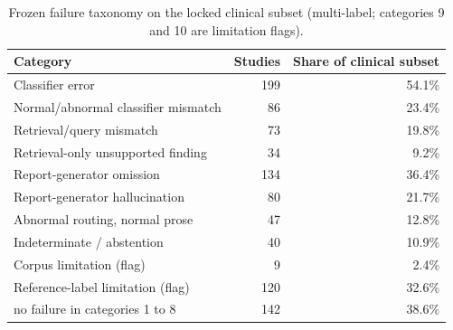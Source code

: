 \begin{table}[t]
\centering
\scriptsize
\begin{tabular}{lrr}
\hline
Category & Studies & Share of clinical subset \\
\hline
Classifier error & 199 & 54.1\% \\
Normal/abnormal classifier mismatch & 86 & 23.4\% \\
Retrieval/query mismatch & 73 & 19.8\% \\
Retrieval-only unsupported finding & 34 & 9.2\% \\
Report-generator omission & 134 & 36.4\% \\
Report-generator hallucination & 80 & 21.7\% \\
Abnormal routing, normal prose & 47 & 12.8\% \\
Indeterminate / abstention & 40 & 10.9\% \\
Corpus limitation (flag) & 9 & 2.4\% \\
Reference-label limitation (flag) & 120 & 32.6\% \\
no failure in categories 1 to 8 & 142 & 38.6\% \\
\hline
\end{tabular}
\caption{Frozen failure taxonomy on the locked clinical subset (multi-label; categories 9 and 10 are limitation flags).}
\label{tab:table9_failure_analysis}
\end{table}
